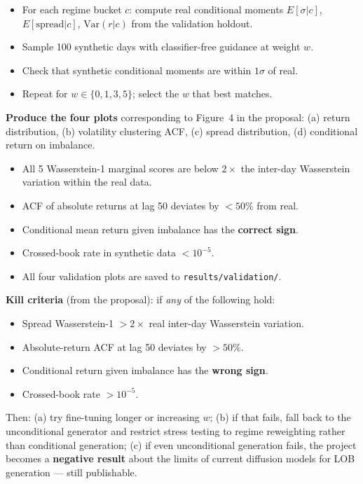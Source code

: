 \documentclass[11pt,a4paper]{article}
\begin{document}
\begin{enumerate}[nosep]
    \begin{itemize}[nosep]
      \item For each regime bucket $c$: compute real conditional moments $E[\sigma | c]$, $E[\text{spread} | c]$, $\text{Var}(r | c)$ from the validation holdout.
      \item Sample 100 synthetic days with classifier-free guidance at weight $w$.
      \item Check that synthetic conditional moments are within $1\sigma$ of real.
      \item Repeat for $w \in \{0, 1, 3, 5\}$; select the $w$ that best matches.
    \end{itemize}
\end{enumerate}

\textbf{Produce the four plots} corresponding to Figure~4 in the proposal: (a) return distribution, (b) volatility clustering ACF, (c) spread distribution, (d) conditional return on imbalance.

\begin{successbox}
  \begin{itemize}[nosep]
    \item All 5 Wasserstein-1 marginal scores are below $2\times$ the inter-day Wasserstein variation within the real data.
    \item ACF of absolute returns at lag 50 deviates by $< 50\%$ from real.
    \item Conditional mean return given imbalance has the \textbf{correct sign}.
    \item Crossed-book rate in synthetic data $< 10^{-5}$.
    \item All four validation plots are saved to \texttt{results/validation/}.
  \end{itemize}
\end{successbox}

\begin{warnbox}
  \textbf{Kill criteria} (from the proposal): if \textit{any} of the following hold:
  \begin{itemize}[nosep]
    \item Spread Wasserstein-1 $> 2\times$ real inter-day Wasserstein variation.
    \item Absolute-return ACF at lag 50 deviates by $> 50\%$.
    \item Conditional return given imbalance has the \textbf{wrong sign}.
    \item Crossed-book rate $> 10^{-5}$.
  \end{itemize}
  Then: (a) try fine-tuning longer or increasing $w$; (b) if that fails, fall back to the unconditional generator and restrict stress testing to regime reweighting rather than conditional generation; (c) if even unconditional generation fails, the project becomes a \textbf{negative result} about the limits of current diffusion models for LOB generation --- still publishable.
\end{warnbox}
\end{document}
